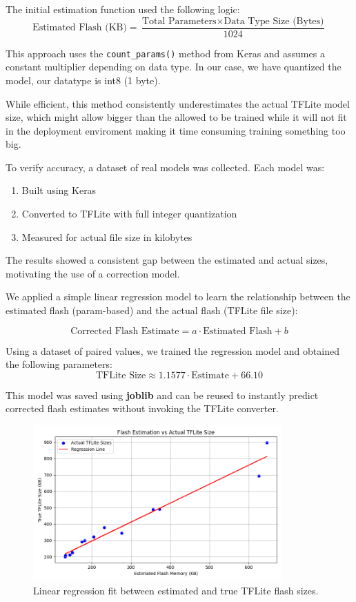 The initial estimation function used the following logic:
\[
\text{Estimated Flash (KB)} = \frac{\text{Total Parameters} \times \text{Data Type Size (Bytes)}}{1024}
\]

This approach uses the \texttt{count\_params()} method from Keras and assumes a constant multiplier depending on data type. In our case, we have quantized the model, our datatype is int8 (1 byte).

While efficient, this method consistently underestimates the actual TFLite model size, which might allow bigger than the allowed to be trained while it will not fit in the deployment enviroment making it time consuming training something too big.

To verify accuracy, a dataset of real models was collected. Each model was:
\begin{enumerate}
    \item Built using Keras
    \item Converted to TFLite with full integer quantization
    \item Measured for actual file size in kilobytes
\end{enumerate}

The results showed a consistent gap between the estimated and actual sizes, motivating the use of a correction model.

We applied a simple linear regression model to learn the relationship between the estimated flash (param-based) and the actual flash (TFLite file size):

\[
\text{Corrected Flash Estimate} = a \cdot \text{Estimated Flash} + b
\]

Using a dataset of paired values, we trained the regression model and obtained the following parameters:
\[
\text{TFLite Size} \approx 1.1577 \cdot \text{Estimate} + 66.10
\]

 This model was saved using \textbf{joblib} and can be reused to instantly predict corrected flash estimates without invoking the TFLite converter.

 \begin{figure}[ht]
  \centering
  \includegraphics[width=0.85\textwidth]{Pictures/flash_regression_plot.png}
  \caption{Linear regression fit between estimated and true TFLite flash sizes.}
  \label{fig:flash-regression}
\end{figure}


